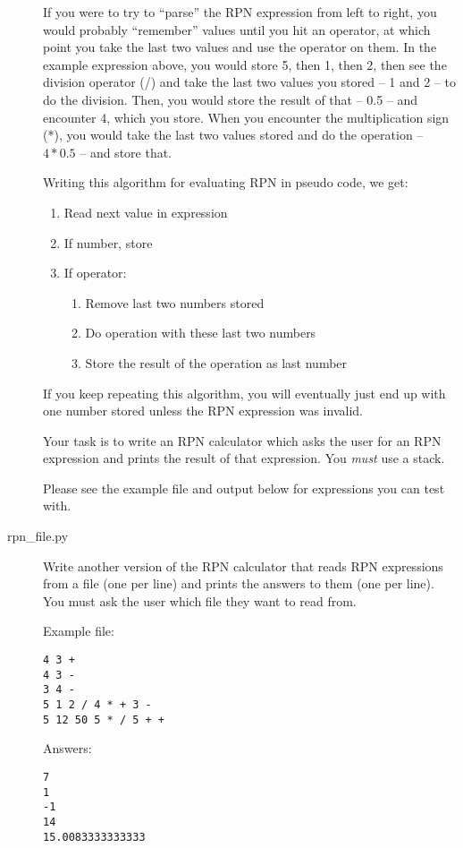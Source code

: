 \documentclass[11pt]{cselabheader}
\begin{document}
\begin{description}
    If you were to try to ``parse'' the RPN expression from left to right, you
    would probably ``remember'' values until you hit an operator, at which point
    you take the last two values and use the operator on them. In the example
    expression above, you would store 5, then 1, then 2, then see the division
    operator (/) and take the last two values you stored -- 1 and 2 -- to do the
    division. Then, you would store the result of that -- 0.5 -- and encounter
    4, which you store. When you encounter the multiplication sign (*), you
    would take the last two values stored and do the operation -- $4 * 0.5$ --
    and store that. 

    Writing this algorithm for evaluating RPN in pseudo code, we get:

\begin{enumerate}
  \item Read next value in expression
  \item If number, store
  \item If operator:
    \begin{enumerate}
      \item Remove last two numbers stored
      \item Do operation with these last two numbers
      \item Store the result of the operation as last number
    \end{enumerate}
\end{enumerate}

    If you keep repeating this algorithm, you will eventually just end up with
    one number stored unless the RPN expression was invalid.

    Your task is to write an RPN calculator which asks the user for an RPN
    expression and prints the result of that expression. You \emph{must} use a
    stack.

    Please see the example file and output below for expressions you can test
    with.

  \item[rpn\_file.py] Write another version of the RPN calculator that reads
    RPN expressions from a file (one per line) and prints the answers to them
    (one per line). You must ask the user which file they want to read from.

    Example file:
    \begin{lstlisting}
4 3 +
4 3 -
3 4 -
5 1 2 / 4 * + 3 -
5 12 50 5 * / 5 + +
    \end{lstlisting}

    Answers:
    \begin{lstlisting}
7
1
-1
14
15.0083333333333
    \end{lstlisting}
    
\end{description}
\end{document}
